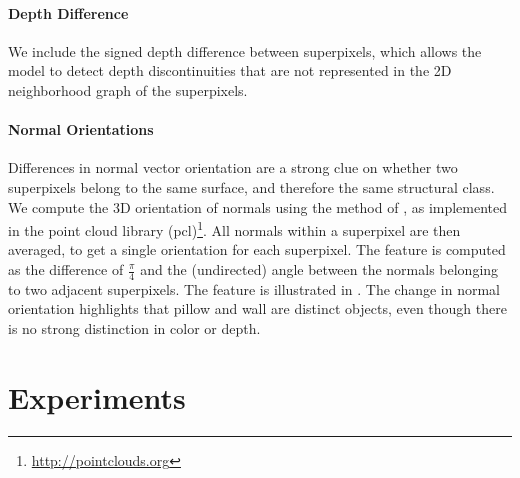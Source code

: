 \paragraph{Depth Difference}
    We include the signed depth difference between superpixels, which
    allows the model to detect depth discontinuities that are not
    represented in the 2D neighborhood graph of the superpixels.


\paragraph{Normal Orientations}
    Differences in normal vector orientation are a strong clue on
    whether two superpixels belong to the same surface, and therefore the
    same structural class.
    We compute the 3D orientation of normals using the method of \citet{holz_2011_robocup},
    as implemented in the point cloud library (pcl)\footnote{\url{http://pointclouds.org}}.
    All normals within a superpixel are then averaged, to get a single orientation for each superpixel.
    The feature is computed as the difference of $\frac{\pi}{4}$ and the (undirected) angle between the normals belonging
    to two adjacent superpixels.  
    The feature is illustrated in . The change
    in normal orientation highlights that pillow and wall are distinct
    objects, even though there is no strong distinction in color or depth.


\section{Experiments}

